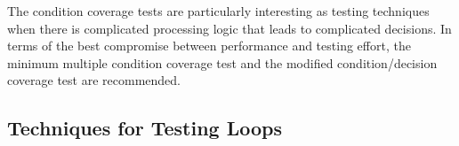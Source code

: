 



	The condition coverage tests are particularly interesting as testing techniques when there is complicated processing logic that leads to complicated decisions. In terms of the best compromise between performance and testing effort, the minimum multiple condition coverage test and the modified condition/decision coverage test are recommended.

	\subsection{Techniques for Testing Loops}

